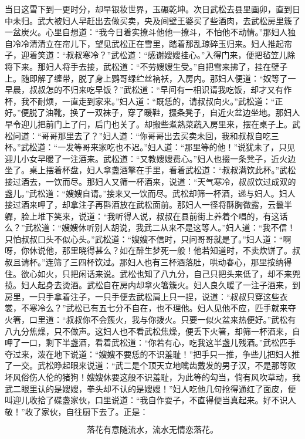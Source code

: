 当日这雪下到一更时分，却早银妆世界，玉碾乾坤。次日武松去县里画卯，直到日中未归。武大被妇人早赶出去做买卖，央及间壁王婆买了些酒肉，去武松房里簇了一盆炭火。心里自想道：“我今日着实撩斗他他一撩斗，不怕他不动情。”那妇人独自冷冷清清立在帘儿下，望见武松正在雪里，踏着那乱琼碎玉归来。妇人推起帘子，迎着笑道：“叔叔寒冷？”武松道：“感谢嫂嫂挂心。”入得门来，便把毡笠儿除将下来。那妇人将手去接，武松道：“不劳嫂嫂生受。”自把雪来拂了，挂在壁子上。随即解了缠带，脱了身上鹦哥绿纻丝衲袄，入房内。那妇人便道：“奴等了一早晨，叔叔怎的不归来吃早饭？”武松道：“早间有一相识请我吃饭，却才又有作杯，我不耐烦，一直走到家来。”妇人道：“既恁的，请叔叔向火。”武松道：“正好。”便脱了油靴，换了一双袜子，穿了暖鞋，掇条凳子，自近火盆边坐地。那妇人早令迎儿把前门上了闩，后门也关了。却搬些煮熟菜蔬入房里来，摆在桌子上。武松问道：“哥哥那里去了？”妇人道：“你哥哥出去买卖未回，我和叔叔自吃三杯。”武松道：“一发等哥来家吃也不迟。”妇人道：“那里等的他！”说犹未了，只见迎儿小女早暖了一注酒来。武松道：“又教嫂嫂费心。”妇人也掇一条凳子，近火边坐了。桌上摆着杯盘，妇人拿盏酒擎在手里，看着武松道：“叔叔满饮此杯。”武松接过酒去，一饮而尽。那妇人又筛一杯酒来，说道：“天气寒冷，叔叔饮过成双的盏儿。”武松道：“嫂嫂自请。”接来又一饮而尽。武松却筛一杯酒，递与妇人。妇人接过酒来呷了，却拿注子再斟酒放在武松面前。那妇人一径将酥胸微露，云鬟半軃，脸上堆下笑来，说道：“我听得人说，叔叔在县前街上养着个唱的，有这话么？”武松道：“嫂嫂休听别人胡说，我武二从来不是这等人。”妇人道：“我不信！只怕叔叔口头不似心头。”武松道：“嫂嫂不信时，只问哥哥就是了。”妇人道：“啊呀，你休说他，那里晓得甚么？如在醉生梦死一般！他若知道时，不卖炊饼了。叔叔且请杯。”连筛了三四杯饮过。那妇人也有三杯酒落肚，哄动春心，那里按纳得住。欲心如火，只把闲话来说。武松也知了八九分，自己只把头来低了，却不来兜揽。妇人起身去烫酒。武松自在房内却拿火箸簇火。妇人良久暖了一注子酒来，到房里，一只手拿着注子，一只手便去武松肩上只一捏，说道：“叔叔只穿这些衣裳，不寒冷么？”武松已有五七分不自在，也不理他。妇人见他不应，匹手就来夺火箸，口里道：“叔叔你不会簇火，我与你拨火。只要一似火盆来热便好。”武松有八九分焦燥，只不做声。这妇人也不看武松焦燥，便丢下火箸，却筛一杯酒来，自呷了一口，剩下半盏酒，看着武松道：“你若有心，吃我这半盏儿残酒。”武松匹手夺过来，泼在地下说道：“嫂嫂不要恁的不识羞耻！”把手只一推，争些儿把妇人推了一交。武松睁起眼来说道：“武二是个顶天立地噙齿戴发的男子汉，不是那等败坏风俗伤人伦的猪狗！嫂嫂休要这般不识羞耻，为此等的勾当，倘有风吹草动，我武二眼里认的是嫂嫂，拳头却不认的是嫂嫂！”妇人吃他几句抢得通红了面皮，便叫迎儿收拾了碟盏家伙，口里说道：“我自作耍子，不直得便当真起来。好不识人敬！”收了家伙，自往厨下去了。正是：

\[
落花有意随流水，流水无情恋落花。
\]

